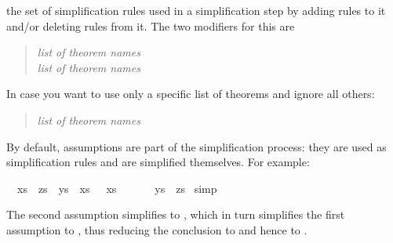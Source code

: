 \begin{isabellebody}
\begin{isamarkuptext}
the set of simplification rules used in a simplification step by adding rules
to it and/or deleting rules from it. The two modifiers for this are
\begin{quote}
 \textit{list of theorem names}\\
 \textit{list of theorem names}
\end{quote}
In case you want to use only a specific list of theorems and ignore all
others:
\begin{quote}
 \textit{list of theorem names}
\end{quote}%
\end{isamarkuptext}%
%
%
\begin{isamarkuptext}%
By default, assumptions are part of the simplification process: they are used
as simplification rules and are simplified themselves. For example:%
\end{isamarkuptext}%
\ {\isachardoublequote}{\isasymlbrakk}\ xs\ {\isacharat}\ zs\ {\isacharequal}\ ys\ {\isacharat}\ xs{\isacharsemicolon}\ {\isacharbrackleft}{\isacharbrackright}\ {\isacharat}\ xs\ {\isacharequal}\ {\isacharbrackleft}{\isacharbrackright}\ {\isacharat}\ {\isacharbrackleft}{\isacharbrackright}\ {\isasymrbrakk}\ {\isasymLongrightarrow}\ ys\ {\isacharequal}\ zs{\isachardoublequote}\isanewline
{}\ simp\isanewline
{}%
\begin{isamarkuptext}%
\noindent
The second assumption simplifies to , which in turn
simplifies the first assumption to , thus reducing the
conclusion to  and hence to .


\end{isamarkuptext}
\end{isabellebody}
